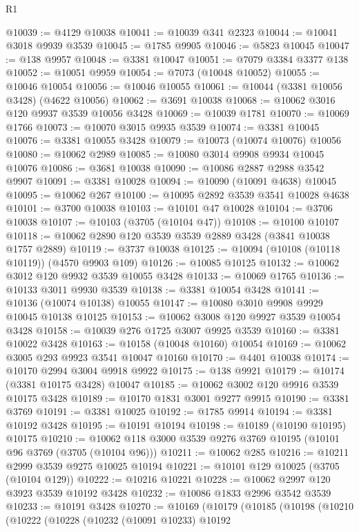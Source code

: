 \begin{lexlean}{R1}
\begin{coremodule}
@10039 := @4129 @10038
@10041 := @10039 @341 @2323
@10044 := @10041 @3018 @9939 @3539
@10045 := @1785 @9905
@10046 := @5823 @10045
@10047 := @138 @9957
@10048 := @3381 @10047
@10051 := @7079 @3384 @3377 @138
@10052 := @10051 @9959
@10054 := @7073 (@10048 @10052)
@10055 := @10046 @10054
@10056 := @10046 @10055
@10061 := @10044 (@3381 @10056 @3428) (@4622 @10056)
@10062 := @3691 @10038
@10068 := @10062 @3016 @120 @9937 @3539 @10056 @3428
@10069 := @10039 @1781
@10070 := @10069 @1766
@10073 := @10070 @3015 @9935 @3539
@10074 := @3381 @10045
@10076 := @3381 @10055 @3428
@10079 := @10073 (@10074 @10076) @10056
@10080 := @10062 @2989
@10085 := @10080 @3014 @9908 @9934 @10045 @10076
@10086 := @3681 @10038
@10090 := @10086 @2887 @2988 @3542 @9907
@10091 := @3381 @10028
@10094 := @10090 (@10091 @4638) @10045
@10095 := @10062 @267
@10100 := @10095 @2892 @3539 @3541 @10028 @4638
@10101 := @3700 @10038
@10103 := @10101 @47 @10028
@10104 := @3706 @10038
@10107 := @10103 (@3705 (@10104 @47))
@10108 := @10100 @10107
@10118 := @10062 @2890 @120 @3539 @3539 @2889 @3428 (@3841 @10038 @1757 @2889)
@10119 := @3737 @10038
@10125 := @10094 (@10108 (@10118 @10119)) (@4570 @9903 @109)
@10126 := @10085 @10125
@10132 := @10062 @3012 @120 @9932 @3539 @10055 @3428
@10133 := @10069 @1765
@10136 := @10133 @3011 @9930 @3539
@10138 := @3381 @10054 @3428
@10141 := @10136 (@10074 @10138) @10055
@10147 := @10080 @3010 @9908 @9929 @10045 @10138 @10125
@10153 := @10062 @3008 @120 @9927 @3539 @10054 @3428
@10158 := @10039 @276 @1725 @3007 @9925 @3539
@10160 := @3381 @10022 @3428
@10163 := @10158 (@10048 @10160) @10054
@10169 := @10062 @3005 @293 @9923 @3541 @10047 @10160
@10170 := @4401 @10038
@10174 := @10170 @2994 @3004 @9918 @9922
@10175 := @138 @9921
@10179 := @10174 (@3381 @10175 @3428) @10047
@10185 := @10062 @3002 @120 @9916 @3539 @10175 @3428
@10189 := @10170 @1831 @3001 @9277 @9915
@10190 := @3381 @3769
@10191 := @3381 @10025
@10192 := @1785 @9914
@10194 := @3381 @10192 @3428
@10195 := @10191 @10194
@10198 := @10189 (@10190 @10195) @10175
@10210 := @10062 @118 @3000 @3539 @9276 @3769 @10195 (@10101 @96 @3769 (@3705 (@10104 @96)))
@10211 := @10062 @285
@10216 := @10211 @2999 @3539 @9275 @10025 @10194
@10221 := @10101 @129 @10025 (@3705 (@10104 @129))
@10222 := @10216 @10221
@10228 := @10062 @2997 @120 @3923 @3539 @10192 @3428
@10232 := @10086 @1833 @2996 @3542 @3539
@10233 := @10191 @3428
@10270 := @10169
    (@10179
      (@10185
        (@10198
          (@10210
            (@10222
              (@10228
                (@10232
                  (@10091 @10233)
                  @10192

\end{coremodule}
\end{lexlean}

